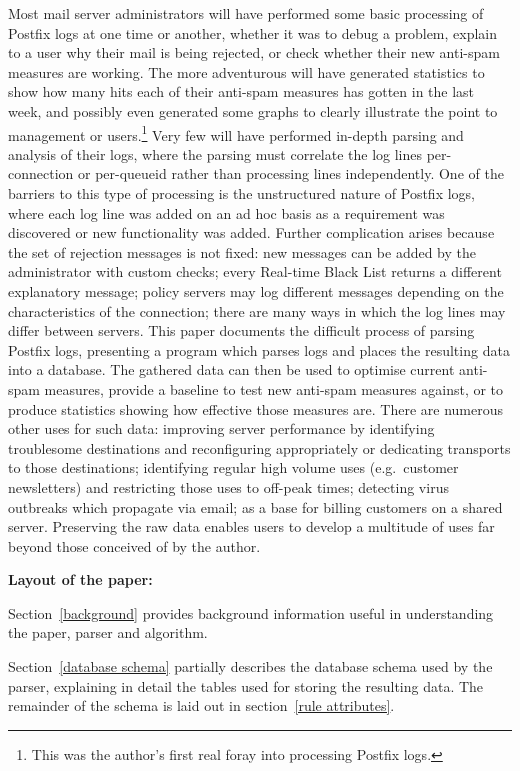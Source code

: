\documentclass[a4paper,12pt,draft]{article}
\begin{document}
Most mail server administrators will have performed some basic processing
of Postfix logs at one time or another, whether it was to debug a problem,
explain to a user why their mail is being rejected, or check whether their
new anti-spam measures are working.  The more adventurous will have
generated statistics to show how many hits each of their anti-spam measures
has gotten in the last week, and possibly even generated some graphs to
clearly illustrate the point to management or users.\footnote{This was the
author's first real foray into processing Postfix logs.}  Very few will
have performed in-depth parsing and analysis of their logs, where the
parsing must correlate the log lines per-connection or per-queueid rather
than processing lines independently.  One of the barriers to this type of
processing is the unstructured nature of Postfix logs, where each log line
was added on an ad hoc basis as a requirement was discovered or new
functionality was added.  Further complication arises because the set of
rejection messages is not fixed: new messages can be added by the
administrator with custom checks; every Real-time Black List returns a
different explanatory message; policy servers may log different messages
depending on the characteristics of the connection; there are many ways in
which the log lines may differ between servers.  This paper documents the
difficult process of parsing Postfix logs, presenting a program which
parses logs and places the resulting data into a database.  The gathered
data can then be used to optimise current anti-spam measures, provide a
baseline to test new anti-spam measures against, or to produce statistics
showing how effective those measures are.  There are numerous other uses
for such data: improving server performance by identifying troublesome
destinations and reconfiguring appropriately or dedicating transports to
those destinations; identifying regular high volume uses (e.g.\ customer
newsletters) and restricting those uses to off-peak times; detecting virus
outbreaks which propagate via email; as a base for billing customers on a
shared server.  Preserving the raw data enables users to develop a
multitude of uses far beyond those conceived of by the author.

\vspace{1em}\noindent\textbf{Layout of the paper:}

Section~\ref{background} provides background information useful in
understanding the paper, parser and algorithm.

Section~\ref{database schema} partially describes the database schema used by
the parser, explaining in detail the tables used for storing the resulting
data.  The remainder of the schema is laid out in section~\ref{rule
attributes}.
\end{document}
